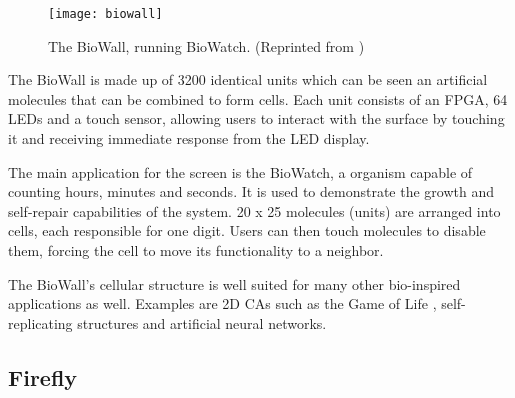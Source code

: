 \begin{figure}[!ht]
    \centering
    \texttt{[image: biowall]}
    \caption[BioWall]{
        The BioWall, running BioWatch.
        (Reprinted from \cite{biowalloverview})
    }
    \label{fig:biowall}
\end{figure}

The BioWall is made up of 3200 identical units which can be seen an artificial molecules that can be combined to form cells.
Each unit consists of an FPGA, 64 LEDs and a touch sensor, allowing users to interact with the surface by touching it and receiving immediate response from the LED display.

The main application for the screen is the BioWatch, a organism capable of counting hours, minutes and seconds.
It is used to demonstrate the growth and self-repair capabilities of the system.
20 x 25 molecules (units) are arranged into cells, each responsible for one digit.
Users can then touch molecules to disable them, forcing the cell to move its functionality to a neighbor.

The BioWall's cellular structure is well suited for many other bio-inspired applications as well.
Examples are 2D CAs such as the Game of Life \cite{gardner1970life}, self-replicating structures and artificial neural networks.

\subsection{Firefly}

